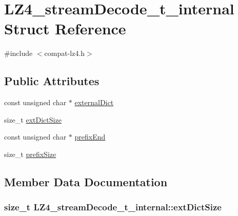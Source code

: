 \hypertarget{struct_l_z4__stream_decode__t__internal}{}\section{L\+Z4\+\_\+stream\+Decode\+\_\+t\+\_\+internal Struct Reference}
\label{struct_l_z4__stream_decode__t__internal}


{\ttfamily \#include $<$compat-\/lz4.\+h$>$}

\subsection*{Public Attributes}
\begin{DoxyCompactItemize}
\item 
const unsigned char $\ast$ \hyperlink{struct_l_z4__stream_decode__t__internal_ac0aa66d825ef7783c0e361d62ee96b94}{external\+Dict}
\item 
size\+\_\+t \hyperlink{struct_l_z4__stream_decode__t__internal_a6c8e2dcc2579727808da0bfe7a44eaa0}{ext\+Dict\+Size}
\item 
const unsigned char $\ast$ \hyperlink{struct_l_z4__stream_decode__t__internal_ad606d5eb3b0f267e29c7caa2ec965c23}{prefix\+End}
\item 
size\+\_\+t \hyperlink{struct_l_z4__stream_decode__t__internal_a44f5f7acc14c2bb3865eccd5372107c4}{prefix\+Size}
\end{DoxyCompactItemize}


\subsection{Member Data Documentation}
\hypertarget{struct_l_z4__stream_decode__t__internal_a6c8e2dcc2579727808da0bfe7a44eaa0}{}
\subsubsection[{ext\+Dict\+Size}]{\setlength{\rightskip}{0pt plus 5cm}size\+\_\+t L\+Z4\+\_\+stream\+Decode\+\_\+t\+\_\+internal\+::ext\+Dict\+Size}\label{struct_l_z4__stream_decode__t__internal_a6c8e2dcc2579727808da0bfe7a44eaa0}
\hypertarget{struct_l_z4__stream_decode__t__internal_ac0aa66d825ef7783c0e361d62ee96b94}{}
